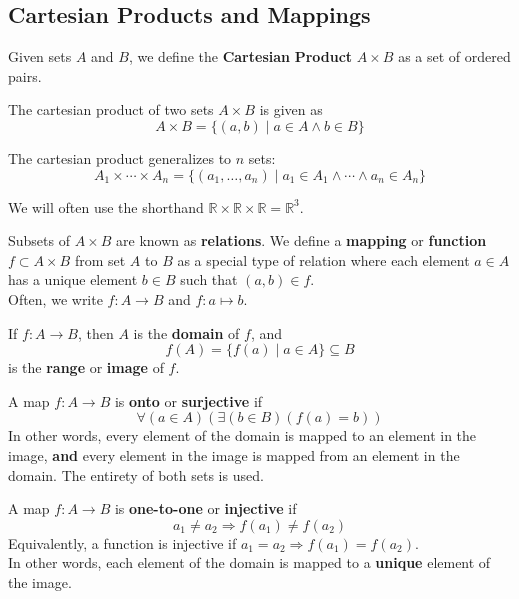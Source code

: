\documentclass[12pt, letterpaper]{report}
\begin{document}
\subsection*{Cartesian Products and Mappings}
Given sets \(A\) and \(B\), we define the \textbf{Cartesian} \textbf{Product} \(A\times B\) as a set of ordered pairs.
\begin{definition}
	The cartesian product of two sets \(A\times B\) is given as
	\[
		A\times B=\{ (a,b)\mid a\in A \land b\in B \} 
	\]
\end{definition}
\begin{proposition}
	The cartesian product generalizes to \(n\) sets:
	\[
		A_1 \times \cdots \times A_n =\{ (a_1,\ldots,a_n)\mid a_1\in A_1 \land \cdots \land a_n\in A_n \} 
	\]
\end{proposition}
We will often use the shorthand \(\mathbb{R} \times \mathbb{R} \times \mathbb{R} =\mathbb{R} ^3\).
\begin{definition}
	Subsets of \(A\times B\) are known as \textbf{relations}. We define a \textbf{mapping} or \textbf{function} \(f\subset A\times B\) from set \(A\) to \(B\) as a special type of relation where each element \(a\in A\) has a unique element \(b\in B\) such that \((a,b)\in f\).\\
	Often, we write \(f:A\to B\) and \(f:a\mapsto b\).
\end{definition}
If \(f:A\to B\), then \(A\) is the \textbf{domain} of \(f\), and
\[
	f(A)=\{ f(a)\mid a\in A \} \subseteq B
\]
is the \textbf{range} or \textbf{image} of \(f\).
\begin{definition}[Surjective]\label{surjective}
	A map \(f:A\to B\) is \textbf{onto} or \textbf{surjective} if
	\[
		\forall (a\in A)(\exists (b\in B)(f(a)=b))
	\]
	In other words, every element of the domain is mapped to an element in the image, \textbf{and} every element in the image is mapped from an element in the domain. The entirety of both sets is used.
\end{definition}
\begin{definition}[Injective]\label{injective}
	A map \(f:A\to B\) is \textbf{one-to-one} or \textbf{injective} if\\
	\[a_1\neq a_2 \Longrightarrow f(a_1)\neq f(a_2)\]
	Equivalently, a function is injective if \(a_1=a_2\Longrightarrow f(a_1)=f(a_2)\).\\
	In other words, each element of the domain is mapped to a \textbf{unique} element of the image.
\end{definition}
\end{document}
